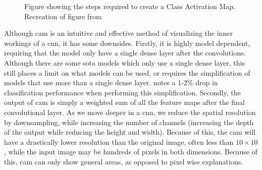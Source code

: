 \documentclass[UKenglish]{uiomasterthesis} %
\theoremstyle{definition}
\begin{document}
\begin{figure}[hbtp]
\begin{center}

    \end{center}
    \caption[CNN example]{Figure showing the steps required to create a Class Activation Map. Recreation of figure from \cite{cam}}
    \label{fig:cam}
\end{figure}

Although \ac{cam} is an intuitive and effective method of visualizing the inner workings of a \ac{cnn}, it has some downsides. Firstly, it is highly model dependent, requiring that the model only have a single dense layer after the convolutions. Although there are some \ac{sota} models which only use a single dense layer, this still places a limit on what models can be used, or requires the simplification of models that use more than a single dense layer. \cite[4]{cam} notes a 1-2\% drop in classification performance when performing this simplification. Secondly, the output of \ac{cam} is simply a weighted sum of all the feature maps after the final convolutional layer. As we move deeper in a \ac{cnn}, we reduce the spatial resolution by downsampling, while increasing the number of channels (increasing the depth of the output while reducing the height and width). Because of this, the \ac{cam} will have a drastically lower resolution than the original image, often less than $10 \times 10$, while the input image may be hundreds of pixels in both dimensions. Because of this, \ac{cam} can only show general areas, as opposed to pixel wise explanations.
\\
\end{document}
